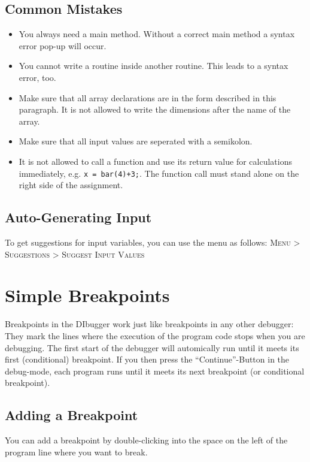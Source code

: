 \documentclass[parskip=full]{memoir}
\begin{document}
\section{Common Mistakes}
\begin{itemize}
\item You always need a main method. Without a correct main method a syntax error pop-up will occur.
\item You cannot write a routine inside another routine. This leads to a syntax error, too.
\item Make sure that all array declarations are in the form described in this paragraph. It is not allowed to write the dimensions after the name of the array.
\item Make sure that all input values are seperated with a semikolon.  
\item It is not allowed to call a function and use its return value for calculations immediately, e.g. \texttt{x = bar(4)+3;}. The function call must stand alone on the right side of the assignment. 
\end{itemize}

\section{Auto-Generating Input}
To get suggestions for input variables, you can use the menu as follows:
\textsc{Menu > Suggestions > Suggest Input Values}

\chapter{Simple Breakpoints}
Breakpoints in the DIbugger work just like breakpoints in any other debugger: They mark the lines where the execution of the program code stops when you are debugging. The first start of the debugger will automically run until it meets its first (conditional) breakpoint. If you then press the \enquote{Continue}-Button in the debug-mode, each program runs until it meets its next breakpoint (or conditional breakpoint).

\section{Adding a Breakpoint}
You can add a breakpoint by double-clicking into the space on the left of the program line where you want to break.
\end{document}
